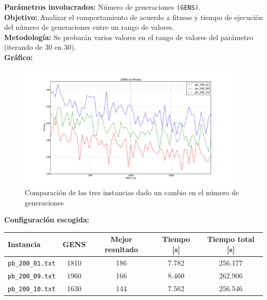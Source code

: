 \textbf{Parámetros involucrados:} Número de generaciones \texttt{(GENS)}.\\

\textbf{Objetivo:} Analizar el comportamiento de acuerdo a fitness y tiempo de ejecución del número de generaciones entre un rango de valores.\\

\textbf{Metodología:} Se probarán varios valores en el rango de valores del parámetro \blue{[10,2000]} (iterando de 30 en 30).\\

\textbf{Gráfico:}\\

\begin{figure}[h!]
\begin{center}
	\includegraphics[width=0.95\textwidth]{img/2.pdf}
	\caption{Comparaci\'on de las tres instancias dado un cambio en el n\'umero de generaciones}
	\label{fig:2}
\end{center}
\end{figure}

\textbf{Configuración escogida:}\\

\begin{center}
\begin{tabular}{|l|c|c|c|c|}
	\hline
	\textbf{Instancia} & \textbf{GENS} &\textbf{Mejor resultado} & \textbf{Tiempo [s] } & \textbf{Tiempo total [s]}\\\hline
	\texttt{pb\_200\_01.txt} & 1810 & 186 & 7.782 & 256.177 \\\hline
	\texttt{pb\_200\_09.txt} & 1960 & 166 & 8.460 & 262.906 \\\hline
	\texttt{pb\_200\_10.txt} & 1630 & 144 & 7.562 & 256.546 \\\hline
\end{tabular}
\end{center}

